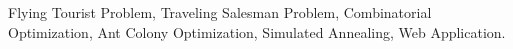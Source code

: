 Flying Tourist Problem, Traveling Salesman Problem, 
Combinatorial Optimization, Ant Colony Optimization, Simulated 
Annealing, Web Application.